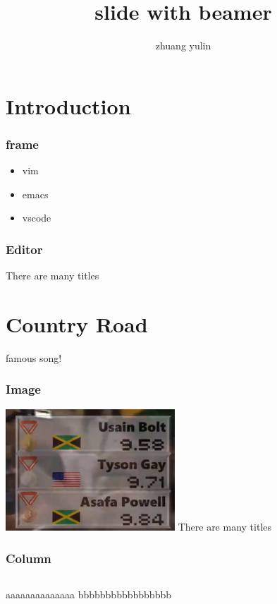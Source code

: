 \documentclass{beamer}
\title{slide with beamer}
\author{zhuang yulin}
\begin{document}
\maketitle

\section{Introduction}

    \begin{frame}
        \frametitle{frame}
        \begin{itemize}
        \item vim \pause
        \item emacs \pause
        \item vscode \pause
        \end{itemize}
    \end{frame}

    \begin{frame}
        \frametitle{Editor}
        There are many titles
    \end{frame}


\section{Country Road}
    famous song!

    \begin{frame}
        \frametitle{Image}
        \includegraphics[width=2.5in]{bolt.png}
        There are many titles
    \end{frame}

    \begin{frame}
        \frametitle{Column}
        \begin{columns}
            aaaaaaaaaaaaaa
            bbbbbbbbbbbbbbbbb
        \end{columns}
    \end{frame}
\end{document}
